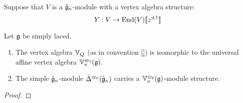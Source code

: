         Suppose that $V$ is a $\hat{\mathfrak{g}}_{\kappa}$-module with a vertex algebra structure:
            $$Y: V \to \mathrm{End}(V)[\![z^{\pm 1}]\!]$$
        

        \begin{theorem} \label{theorem: level_1_FKS_realisation}
            Let $\mathfrak{g}$ be simply laced.
            \begin{enumerate}
                \item The vertex algebra $\mathbb{V}_Q$ (as in convention \ref{}) is isomorphic to the universal affine vertex algebra $\mathbb{V}_{\kappa}^{\varpi_0}(\mathfrak{g})$.
                \item The simple $\hat{\mathfrak{g}}_{\kappa}$-module $\bar{\Delta}^{\varpi_0}(\hat{\mathfrak{g}}_{\kappa})$ carries a $\mathbb{V}_{\kappa}^{\varpi_0}(\mathfrak{g})$-module structure.
            \end{enumerate}
        \end{theorem}
            \begin{proof}
                
            \end{proof}